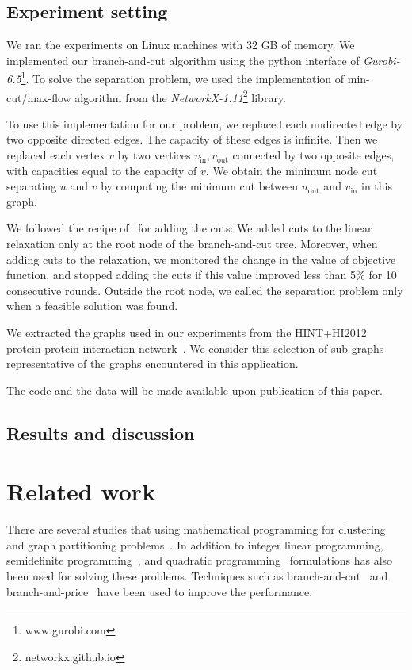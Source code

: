 \documentclass[conference,compsoc]{IEEEtran}
\begin{document}
\subsection{Experiment setting}
We ran the experiments on Linux machines with 32 GB of memory. We implemented our branch-and-cut algorithm using the python interface
of \emph{Gurobi-6.5}\footnote{www.gurobi.com}. To solve the separation problem, we used the implementation of min-cut/max-flow algorithm from the \emph{NetworkX-1.11}\footnote{networkx.github.io} library. 

To use this implementation for our problem, we replaced
each undirected edge by two opposite directed edges. The capacity of
these edges is infinite. Then we replaced each vertex $v$ by two
vertices $v_{\text{in}}, v_{\text{out}}$ connected by two opposite
edges, with capacities equal to the capacity of $v$. We obtain the
minimum node cut separating $u$ and $v$ by computing the minimum cut
between $u_{\text{out}}$ and $v_{\text{in}}$ in this graph.

We followed the recipe of~\cite{CarvajalCGVW13} for adding the cuts: We added cuts to the
linear relaxation only at the root node of the branch-and-cut tree.
Moreover, when adding cuts to the relaxation, we monitored the change in
the value of objective function, and stopped adding the cuts if this
value improved less than 5\% for 10 consecutive rounds. Outside the root
node, we called the separation problem only when a feasible solution was
found.

We extracted the graphs used in our experiments from the HINT+HI2012 protein-protein interaction network~\cite{das2012hint,yu2011next}. We consider this selection of sub-graphs representative of the graphs encountered in this application.



The code and the data will be made available upon publication of this paper.

\subsection{Results and discussion}

\section{Related work}
\label{sec:related}
There are several studies that using mathematical programming
for clustering and graph partitioning
problems~\cite{HansenJ97}. In addition to integer linear programming, semidefinite programming~\cite{ArmbrusterFHM08,LisserR03}, and quadratic programming~\cite{FanP10} formulations has also been used for solving these problems. Techniques such as branch-and-cut~\cite{FerreiraMSWW98,GrotschelW89} and branch-and-price~\cite{MehrotraT98,JiM07} have been used to improve the performance. 
\end{document}
